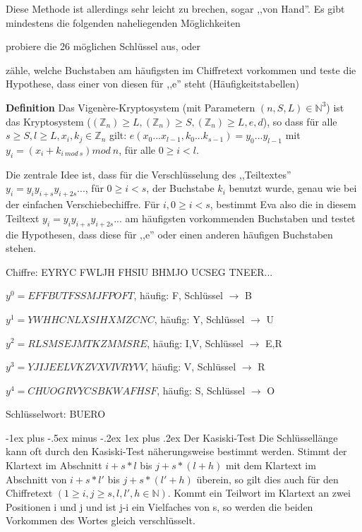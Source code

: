 \documentclass[a4paper]{article}
\makeatletter
\renewcommand{\subsubsection}{\@startsection{subsubsection}{3}{0mm}%
 {-1ex plus -.5ex minus -.2ex}%
 {1ex plus .2ex}%
 {\normalfont\small\bfseries}}
\makeatother
\begin{document}
\begin{multicols}{3}
    Diese Methode ist allerdings sehr leicht zu brechen, sogar ,,von Hand''. Es gibt mindestens die folgenden naheliegenden Möglichkeiten
    \begin{enumerate*}
        \item probiere die 26 möglichen Schlüssel aus, oder
        \item zähle, welche Buchstaben am häufigsten im Chiffretext vorkommen und teste die Hypothese, dass einer von diesen für ,,e'' steht (Häufigkeitstabellen)
    \end{enumerate*}

    \textbf{Definition} Das Vigenère-Kryptosystem (mit Parametern $(n,S,L)\in\mathbb{N}^3$) ist das Kryptosystem ($(\mathbb{Z}_n)\geq L,(\mathbb{Z}_n)\geq S,(\mathbb{Z}_n)\geq L,e,d$), so dass für alle $s\geq S,l\geq L,x_i,k_j\in\mathbb{Z}_n$ gilt: $e(x_0...x_{l-1},k_0 ...k_{s-1})=y_0 ...y_{l-1}$ mit $y_i=(x_i+k_{i\ mod\ s}) mod\ n$, für alle $0\geq i < l$.

    Die zentrale Idee ist, dass für die Verschlüsselung des ,,Teiltextes'' $y_i=y_iy_{i+s}y_{i+2s}...$, für $0\geq i<s$, der Buchstabe $k_i$ benutzt wurde, genau wie bei der einfachen Verschiebechiffre. Für $i,0\geq i<s$, bestimmt Eva also die in diesem Teiltext $y_i=y_iy_{i+s}y_{i+2s}...$ am häufigsten vorkommenden Buchstaben und testet die Hypothesen, dass diese für ,,e'' oder einen anderen häufigen Buchstaben stehen.
        
    \begin{itemize*} 
        \item Chiffre: EYRYC FWLJH FHSIU BHMJO UCSEG TNEER...
        \item $y^0 =EFFBUTFSSMJFPOFT$, häufig: F, Schlüssel $\rightarrow$ B 
        \item $y^1 =YWHHCNLXSIHXMZCNC$, häufig: Y, Schlüssel $\rightarrow$ U 
        \item $y^2 =RLSMSEJMTKZMMSRE$, häufig: I,V, Schlüssel $\rightarrow$ E,R
        \item $y^3 =YJIJEELVKZVXVIVRYVV$, häufig: V, Schlüssel $\rightarrow$ R
        \item $y^4 =CHUOGRVYCSBKWAFHSF$, häufig: S, Schlüssel $\rightarrow$ O
        \item Schlüsselwort: BUERO 
    \end{itemize*}

    \subsubsection{Der Kasiski-Test}
    Die Schlüssellänge kann oft durch den Kasiski-Test näherungsweise bestimmt werden. Stimmt der Klartext im Abschnitt $i+s*l$ bis $j+s*(l+h)$ mit dem Klartext im Abschnitt von $i+s*l'$ bis $j+s*(l'+h)$ überein, so gilt dies auch für den Chiffretext $(1\geq i,j\geq s,l,l',h\in\mathbb{N})$. Kommt ein Teilwort im Klartext an zwei Positionen i und j und ist j-i ein Vielfaches von s, so werden die beiden Vorkommen des Wortes gleich verschlüsselt.


\end{multicols}
\end{document}
